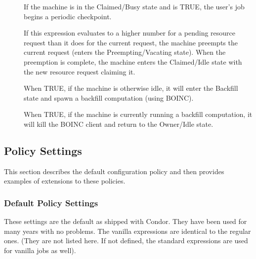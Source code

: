 \begin{description}
\item[] If the machine is in the
  Claimed/Busy state and  is TRUE, the
  user's job begins a periodic checkpoint.
  
\item[] If this expression evaluates to a higher number for
  a pending resource request than it does for the current request, the
  machine preempts the current request (enters the
  Preempting/Vacating state).  When the preemption is complete, the
  machine enters the Claimed/Idle state with the new resource
  request claiming it.

\item[] When TRUE, if the machine is otherwise
  idle, it will enter the Backfill state and spawn a backfill
  computation (using BOINC).

\item[] When TRUE, if the machine is currently
  running a backfill computation, it will kill the BOINC client and
  return to the Owner/Idle state.

\end{description}

\subsection{\label{sec:Policy-Settings}Policy Settings}

This section describes the default configuration
policy and then provides examples of extensions to these
policies.

\subsubsection{\label{sec:Default-Policy}Default Policy Settings}

These settings are the default as shipped with Condor.  They have been
used for many years with no problems.  The vanilla expressions are
identical to the regular ones. (They are not listed here.  If
not defined, the standard expressions are used for vanilla jobs
as well).

